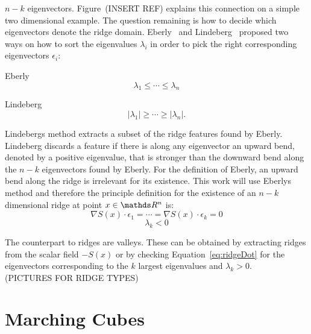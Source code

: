 $n-k$ eigenvectors. Figure~(INSERT REF) explains this connection on a
simple two dimensional example. The question remaining is how to decide
which eigenvectors denote the ridge domain. Eberly~\cite{Eberly} and
Lindeberg~\cite{Lindeberg} proposed two ways on how to sort the
eigenvalues $\lambda_i$ in order to pick the right corresponding
eigenvectors $\epsilon_i$:\\
\begin{inparaenum}[]
  \item Eberly
  \begin{equation}
   \lambda_1 \leq \cdots \leq \lambda_n
  \end{equation}
  \item Lindeberg
  \begin{equation}
    \lvert \lambda_1 \rvert \geq \cdots \geq \lvert \lambda_n \rvert.
  \end{equation}
\end{inparaenum}
\noindent Lindebergs method extracts a subset of the ridge features
found by Eberly. Lindeberg discards a feature if there is along any
eigenvector an upward bend, denoted by a positive eigenvalue, that is
stronger than the downward bend along the $n-k$ eigenvectors found by
Eberly. For the definition of Eberly, an upward bend along the ridge is
irrelevant for its existence. This work will use Eberlys method and
therefore the principle definition for the existence of an $n-k$
dimensional ridge at point $x \in \real^n$ is:\\

\begin{equation}\label{eq:ridgeDot}
  \nabla S(x) \cdot \epsilon_1 = \cdots = \nabla S(x) \cdot \epsilon_{k} = 0
\end{equation}
\begin{equation}\label{eq:ridgeEV}
  \lambda_k < 0
\end{equation}

\noindent The counterpart to ridges are valleys. These can be obtained
by extracting ridges from the scalar field $-S(x)$ or by checking
Equation~\ref{eq:ridgeDot} for the eigenvectors corresponding to the
$k$ largest eigenvalues and $\lambda_k > 0$.
\\(PICTURES FOR RIDGE TYPES)

\section{Marching Cubes}

